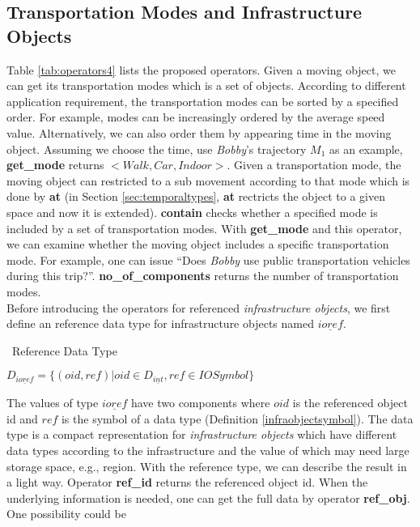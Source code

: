 \subsection{Transportation Modes and Infrastructure Objects}
\label{sec:infrastructureandtm}
Table \ref{tab:operators4} lists the proposed operators. Given a moving object, we can get its transportation modes which is a set of objects. According to different application requirement, the transportation modes 
can be sorted by a specified order. For example, modes can be increasingly ordered by the average speed value. Alternatively, we can also order them by appearing time in the moving object. Assuming we choose the time, use \textit{Bobby}'s trajectory $M_1$ as an example, \textbf{get\_mode} returns $<Walk, Car, Indoor>$. Given a transportation mode, the moving object can restricted to a sub movement according to that mode which is done by \textbf{at} (in Section \ref{sec:temporaltypes}, \textbf{at} rectricts the object to a given space and now it is extended). \textbf{contain} checks whether a specified mode is included by a set of transportation modes. With \textbf{get\_mode} and this operator, we can examine whether the moving object includes a specific transportation mode. For example, one can issue ``Does \textit{Bobby} use public transportation vehicles during this trip?''. \textbf{no\_of\_components} returns the number of transportation modes.\\


Before introducing the operators for referenced \textit{infrastructure objects}, we first define an reference data type for infrastructure objects named $\underline{ioref}$.  

\begin{Statement}
\label{infrastructuretype}
\ Reference Data Type

$D_{\underline{ioref}} = \{(oid,ref)|oid \in D_{\underline{int}}, ref \in IOSymbol\}$

\end{Statement}

The values of type $\underline{ioref}$ have two components where $oid$ is the referenced object id and $ref$ is the symbol of a data type (Definition \ref{infraobjectsymbol}). The data type is a compact representation for \textit{infrastructure objects} which have different data types according to the infrastructure and the value of which may need large storage space, e.g., region. With the reference type, we can describe the result in a light way. Operator \textbf{ref\_id} returns the referenced object id. When the underlying information is needed, one can get the full data by operator 
\textbf{ref\_obj}. One possibility could be \\

